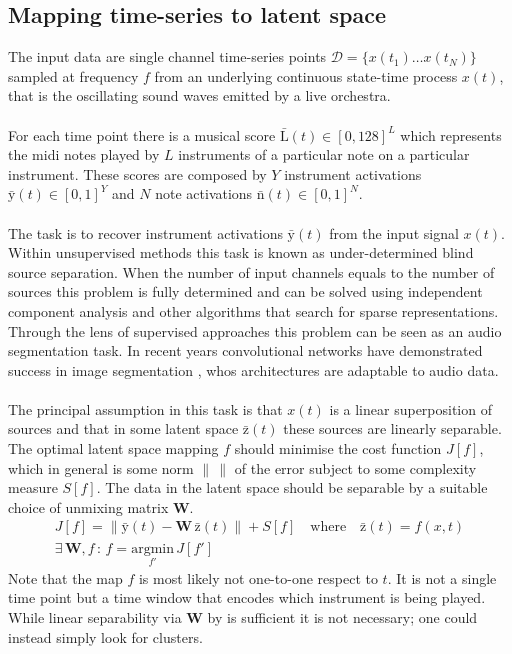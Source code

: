 \documentclass{article}[12pt]
\numberwithin{equation}{section}
\begin{document}
\subsection{Mapping time-series to latent space}
The input data are single channel time-series points $\mathcal{D}=\{x(t_1)\dots
x(t_N)\}$ sampled at frequency $f$ from an underlying continuous state-time
process $x(t)$, that is the oscillating sound waves emitted by a live orchestra.
\\\\
For each time point there is a musical score $\bar{\mathrm{L}}(t)\in[0,128]^L$ which
represents the midi notes played by $L$ instruments of a particular note on a particular instrument. These scores
are composed by $Y$ instrument activations $\bar{\mathrm{y}}(t)\in[0,1]^Y$ and $N$
note activations $\bar{\mathrm{n}}(t)\in[0,1]^N$.
\\\\
The task is to recover instrument activations $\bar{\mathrm{y}}(t)$ from
the input signal $x(t)$. Within unsupervised methods this task is known as
under-determined blind source separation. When the number of input channels
equals to the number of sources this problem is fully determined and can be
solved using independent component analysis
\cite{Platt1995Information-MaximizationDeconvolution} and other algorithms
that search for sparse representations. Through the lens of supervised approaches
this problem can be seen as an audio segmentation task. In recent years
convolutional networks have demonstrated success in image segmentation \cite{},
whos architectures are adaptable to audio data.
\\\\
The principal assumption in this task is that $x(t)$ is a linear superposition
of sources and that in some latent space $\bar{\mathrm{z}}(t)$ these sources are
linearly separable. The optimal latent space mapping $f$ should minimise the
cost function $J[f]$, which in general is some norm $\left\lVert\,\right\rVert$
of the error subject to some complexity measure $S[f]$. The data in the latent
space should be separable by a suitable choice of unmixing matrix $\mathbf{W}$.
\begin{align}
	J[f]=\left\lVert\bar{\mathrm{y}}(t)-\mathbf{W}\,\bar{\mathrm{z}}(t)\right\rVert+S[f]
	\quad\text{where}\quad
	\bar{\mathrm{z}}(t) = f(x,t)\\
	\exists\,\mathbf{W},f\,:\,f=\underset{f'}{\mathrm{argmin}}\,J[f']
	\qquad\qquad\qquad
\end{align}
Note that the map $f$ is most likely not one-to-one respect to $t$. It is not a
single time point but a time window that encodes which instrument is being
played. While linear separability via $\mathbf{W}$ by is sufficient it is not
necessary; one could instead simply look for clusters.
\end{document}
